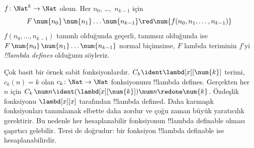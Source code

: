 \begin{defn}
$f\colon\Nat^k\to\Nat$ olsun. Her $n_0$, \dots,~$n_{k-1}$ için
\[
F \, \num{n_0} \, \num{n_1} \dots \num{n_{k-1}} \red
\num{f(n_0,n_1,\dots,n_{k-1})}
\]
$f(n_0,\dots,n_{k-1})$ tanımlı olduğunda geçerli, tanımsız olduğunda ise
$F\,\num{n_0}\,\num{n_1}\dots\num{n_{k-1}}$ normal biçimsizse, $F$ lambda
teriminin $f$'yi \emph{!!{lambda define}s} olduğunu söyleriz.
\end{defn}

Çok basit bir örnek sabit fonksiyonlardır. $C_k\ident\lambd[x][\num{k}]$
terimi, $c_k(n)=k$ olan $c_k\colon\Nat\to\Nat$ fonksiyonunu
!!{lambda define}s. Gerçekten her $n$ için
$C_k\,\num n\ident(\lambd[x][\num{k}])\num n\redone\num{k}$.
Özdeşlik fonksiyonu $\lambd[x][x]$ tarafından !!{lambda defined}.
Daha karmaşık fonksiyonları tanımlamak elbette daha zordur ve çoğu zaman
büyük yaratıcılık gerektirir. Bu nedenle her hesaplanabilir fonksiyonun
!!{lambda definable} olması şaşırtıcı gelebilir. Tersi de doğrudur: bir
fonksiyon !!{lambda definable} ise hesaplanabilirdir.

